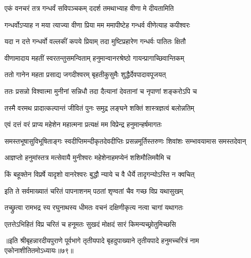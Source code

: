\twolineshloka
{एकं वनचरं तत्र गन्धर्वं सविपञ्चकम्}
{ददर्श तमथाभ्याह वीणा मे दीयतामिति}%

\twolineshloka
{गन्धर्वोऽप्याह न मया त्याज्या वीणा प्रिया मम}
{ममापीष्टेह गन्धर्व वीणेत्याह कपीश्वरः}%

\twolineshloka
{यदा न दत्ते गन्धर्वो वल्लकीं कपये प्रियाम्}
{तदा मुष्टिप्रहारेण गन्धर्वः पातितः क्षितौ}%

\twolineshloka
{वीणामादाय महतीं स्वरतन्तुसमन्विताम्}
{हनुमान्वानरश्रेष्ठो गायन्प्रागाच्छिवान्तिकम्}%

\twolineshloka
{ततो गानेन महता प्रसाद्य जगदीश्वरम्}
{बृहतीकुसुमैः शुद्धैर्देवपादावपूजयत्}%

\twolineshloka
{ततः प्रसन्नो विश्वात्मा मुनीनां सन्निधौ तदा}
{दैत्यानां देवतानां च नृपाणां शङ्करोऽपि च}%

\twolineshloka
{तस्मै वरमथ प्रादात्कल्पान्तं जीवितं पुनः}
{समुद्र लङ्घने शक्तिं शास्त्रज्ञत्वं बलोन्नतिम्}%

\twolineshloka
{एवं दत्तं वरं प्राप्य महेशेन महात्मना}
{प्रत्यक्षं मम विप्रेन्द्र हनुमान्हर्षमागतः}%

\twolineshloka
{समस्तभूषासुविभूषिताङ्गः स्वदीप्तिमन्दीकृतदेवदीप्तिः}
{प्रसन्नमूर्तिस्तरुणः शिवांशः सम्भावयामास समस्तदेवान्}%

\twolineshloka
{आज्ञप्तो हनुमांस्तत्र मत्सेवायै मुनीश्वरः}
{महेशेनाहमप्येनं शशिमौलिमवैमि च}%

\twolineshloka
{किं बहूक्तेन विप्रर्षे यादृशो वानरेश्वरः}
{बुद्धौ न्याये च वै धैर्ये तादृगन्योऽस्ति न क्वचित्}%

\twolineshloka
{इति ते सर्वमाख्यातं चरितं पापनाशनम्}
{पठतां शृण्वतां चैव गच्छ विप्र यथासुखम्}%

\twolineshloka
{तच्छ्रुत्वा रामभद्र स्य रघुनाथस्य धीमतः}
{वचनं दक्षिणीकृत्य नत्वा चागां यथागतः}%

\twolineshloka
{एतत्तेऽभिहितं विप्र चरितं च हनूमतः}
{सुखदं मोक्षदं सारं किमन्यच्छ्रोतुमिच्छसि}%

॥इति श्रीबृहन्नारदीयपुराणे पूर्वभागे तृतीयपादे बृहदुपाख्याने तृतीयपादे हनुमच्चरित्रं नाम एकोनाशीतितमोऽध्यायः॥७९॥

